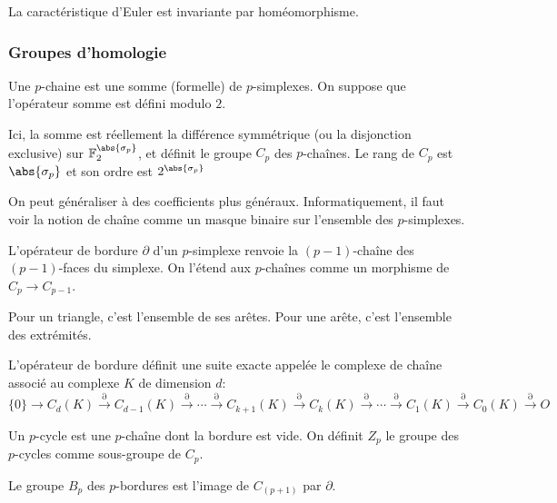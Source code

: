 \begin{proposition}
	La caractéristique d'Euler est invariante par homéomorphisme.
\end{proposition}

\subsubsection{Groupes d'homologie}
\begin{definition}
	Une $p$-chaine est une somme (formelle) de $p$-simplexes. On suppose que l'opérateur somme est défini modulo $2$.
\end{definition}
Ici, la somme est réellement la différence symmétrique (ou la disjonction exclusive) sur $\mathbb{F}_{2}^{\abs{\sigma_{p}}}$, et définit le groupe $C_{p}$ des $p$-chaînes.
Le rang de $C_{p}$ est $\abs{\sigma_{p}}$ et son ordre est $2^{\abs{\sigma_{p}}}$


On peut généraliser à des coefficients plus généraux.
Informatiquement, il faut voir la notion de chaîne comme un masque binaire sur l'ensemble des $p$-simplexes.

\begin{definition}
	L'opérateur de bordure $\partial$ d'un $p$-simplexe renvoie la $(p-1)$-chaîne des $(p-1)$-faces du simplexe.
	On l'étend aux $p$-chaînes comme un morphisme de $C_{p} \to C_{p - 1}$.
\end{definition}
Pour un triangle, c'est l'ensemble de ses arêtes. Pour une arête, c'est l'ensemble des extrémités.
\begin{proposition}
	L'opérateur de bordure définit une suite exacte appelée le complexe de chaîne associé au complexe $K$ de dimension $d$:
	\begin{equation*}
		\{0\} \to C_{d}(K) \xrightarrow{\partial} C_{d - 1}(K)
		\xrightarrow{\partial} \cdots
		\xrightarrow{\partial} C_{k + 1}(K)
		\xrightarrow{\partial} C_{k}(K)
		\xrightarrow{\partial} \cdots
		\xrightarrow{\partial} C_{1}(K)
		\xrightarrow{\partial} C_{0}(K)
		\xrightarrow{\partial} O
	\end{equation*}
\end{proposition}

\begin{definition}
	Un $p$-cycle est une $p$-chaîne dont la bordure est vide.
	On définit $Z_{p}$ le groupe des $p$-cycles comme sous-groupe de $C_{p}$.
\end{definition}

\begin{definition}
	Le groupe $B_{p}$ des $p$-bordures est l'image de $C_{(p + 1)}$ par $\partial$.
\end{definition}

